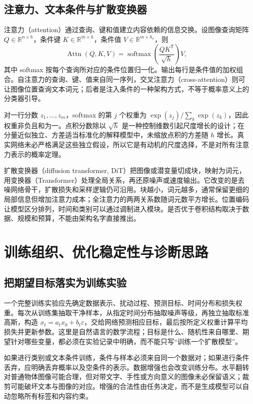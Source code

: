 \documentclass[UTF8,12pt,a4paper,fontset=fandol]{ctexart}
\begin{document}
\subsection{注意力、文本条件与扩散变换器}
注意力（attention）通过查询、键和值建立内容依赖的信息交换。设图像查询矩阵 $Q\in\mathbb R^{n\times h}$，条件键 $K\in\mathbb R^{m\times h}$，条件值 $V\in\mathbb R^{m\times h_v}$，则
\[
 \operatorname{Attn}(Q,K,V)=\operatorname{softmax}\!\left(\frac{QK^\mathsf T}{\sqrt h}\right)V,
\]
其中 softmax 按每个查询所对应的条件位置归一化。输出每行是条件值的加权组合。自注意力的查询、键、值来自同一序列，交叉注意力（cross-attention）则可让图像位置查询文本词元；后者是注入条件的一种架构方式，不等于概率意义上的分类器引导。

对一行分数 $z_1,\ldots,z_m$，softmax 的第 $j$ 个权重为 $\exp(z_j)/\sum_k\exp(z_k)$，因此权重非负且和为一。点积分数除以 $\sqrt h$ 是一种控制维数引起尺度增长的设计；在分量近似独立、方差适当标准化的解释模型中，未缩放点积的方差随 $h$ 增长。真实网络未必严格满足这些独立假设，所以它是有动机的尺度选择，不是对所有注意力表示的概率定理。

扩散变换器（diffusion transformer, DiT）把图像或潜变量切成块，映射为词元，用变换器（Transformer）处理全局关系，再还原噪声或速度输出\cite{peebles2023}。它改变的是去噪网络骨干，扩散损失和采样逻辑仍可沿用。块越小，词元越多，通常保留更细的局部信息但增加注意力成本；全注意力的两两关系数随词元数平方增长。位置编码让模型区分排列，时间和类别可以通过调制进入模块。是否优于卷积结构取决于数据、规模和预算，不能由架构名字直接推出。

\section{训练组织、优化稳定性与诊断思路}
\label{sec:diff-training}
\subsection{把期望目标落实为训练实验}
一个完整训练实验应先确定数据表示、扰动过程、预测目标、时间分布和损失权重。每次从训练集抽取干净样本，从指定时间分布抽取噪声等级，再独立抽取标准高斯，构造 $x_t=a_tx_0+b_t\varepsilon$，交给网络预测相应目标，最后按所定义权重计算平均损失并更新参数。这里是自然语言的数学流程；目标是什么、随机性来自哪里、期望针对哪些变量，都必须在实验记录中明确，而不能只写“训练一个扩散模型”。

如果进行类别或文本条件训练，条件与样本必须来自同一个数据对；如果进行条件丢弃，应明确丢弃概率以及空条件的表示。数据增强也会改变训练分布。水平翻转对普通物体图像可能合理，但对带文字、手性或方向意义的图像未必保留语义；裁剪可能破坏文本与图像的对应。增强的合法性由任务决定，而不是生成模型可以自动忽略所有标签和内容约束。
\end{document}
